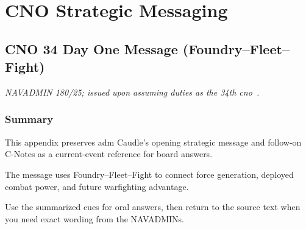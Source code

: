 \documentclass[../main.tex]{subfiles}
\begin{document}
\chapter{CNO Strategic Messaging}\label{ch:cno-strat}
\section{CNO 34 Day One Message (Foundry--Fleet--Fight)}\label{app:cno34-day-one-message}
\emph{\footnotesize NAVADMIN 180/25; issued upon assuming duties as the 34th \ac{cno}~\autocite{cno34-day-one-message-2025}.}

\subsection{Summary}
\begin{description}[style=nextline, labelsep=0.5em, font=\bfseries]
  \item[Purpose.] This appendix preserves \ac{adm} Caudle's opening strategic message and follow-on C-Notes as a current-event reference for board answers.
  \item[Central frame.] The message uses Foundry--Fleet--Fight to connect force generation, deployed combat power, and future warfighting advantage.
  \item[Board use.] Use the summarized cues for oral answers, then return to the source text when you need exact wording from the NAVADMINs.
\end{description}
\end{document}
